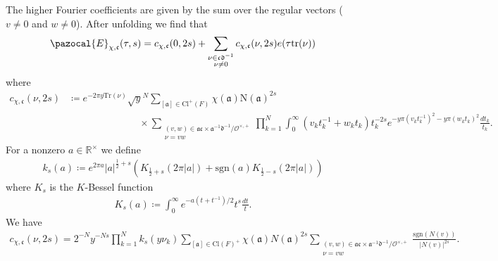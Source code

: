 \documentclass[twoside,a4paper,10pt]{article} %
\newcommand{\8}{\infty}
\newcommand{\R}{\mathbb{R}}
\newcommand{\afrak}{\mathfrak{a}}
\newcommand{\dfrak}{\mathfrak{d}}
\newcommand{\cfrak}{\mathfrak{c}}
\newcommand{\Tr}{\mathrm{Tr}}
\newcommand{\tr}{\mathrm{tr}}
\newcommand{\N}{\mathrm{N}}
\newcommand{\sgn}{\mathrm{sgn}}
\newcommand{\Ocal}{\mathcal{O}}
\newcommand{\Cl}{\textrm{Cl}}
\newcommand{\Ecal}{\pazocal{E}}
\theoremstyle{mytheoremstyle}
\theoremstyle{remark}
\numberwithin{equation}{section}
\begin{document}
The higher Fourier coefficients are given by the sum over the regular vectors ($v \neq 0$ and $w \neq 0$). After unfolding we find that
\begin{align}
 \Ecal_{\chi,\cfrak}(\tau,s)=c_{\chi,\cfrak}(0,2s)+\sum_{\substack{\nu \in \cfrak\dfrak^{-1} \\ \nu \neq 0}} c_{\chi,\cfrak}(\nu,2s) e(\tau \tr(\nu))
\end{align}
where
\begin{align}
c_{\chi,\cfrak}(\nu,2s) & \coloneqq e^{-2\pi y \Tr(\nu)}\sqrt{y}^{N}\sum_{[\afrak] \in \Cl^+(F)} \chi(\afrak) \N(\afrak)^{2s} \\
& \hspace{3cm} \times \sum_{\substack{(v,w) \in \afrak\cfrak \times \afrak^{-1} \dfrak^{-1}/\Ocal^{\times,+} \\ \nu=vw }} \prod_{k=1}^N \int_0^\8 (v_kt^{-1}_k+w_kt_k)t_k^{-2s} e^{-y\pi \left ( v_kt^{-1}_k \right )^2-y\pi \left (w_kt_k \right )^2} \frac{dt_k}{t_k}.
\end{align}
For a nonzero $a \in \R^\times$ we define
\begin{align}
k_s(a) \coloneqq e^{2 \pi a}\vert a \vert^{\frac{1}{2}+s} \left ( K_{\frac{1}{2}+s}(2\pi\vert a\vert)+\sgn(a)K_{\frac{1}{2}-s}(2\pi\vert a\vert) \right )
\end{align}
where $K_s$ is the $K$-Bessel function
\begin{align}
K_s(a) \coloneqq \int_0^\8e^{-a(t+t^{-1})/2}t^s\frac{dt}{t}.
\end{align}
We have
\begin{align}
c_{\chi,\cfrak}(\nu,2s)= 2^{-N}y^{-Ns} \prod_{k=1}^Nk_s(y\nu_k) \sum_{[\afrak] \in \Cl(F)^+} \chi(\afrak) N(\afrak)^{2s}  \sum_{\substack{(v,w) \in \afrak\cfrak \times \afrak^{-1} \dfrak^{-1}/\Ocal^{\times,+} \\ \nu=vw }}  \frac{\sgn(N(v))}{\vert N(v)\vert^{2s}}.
\end{align}
\end{document}
